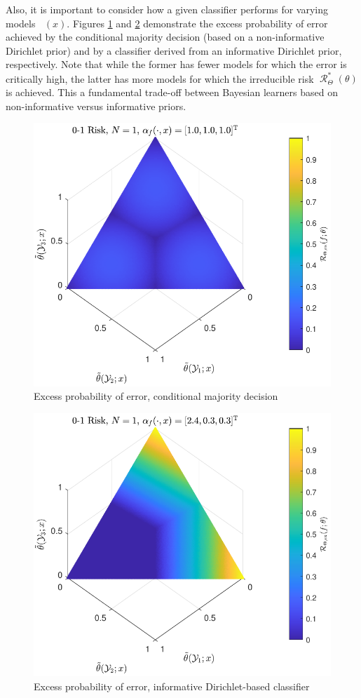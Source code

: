\documentclass[12pt]{report}
\DeclareMathOperator{\Rcal}{\mathcal{R}}
\DeclareMathOperator{\thetac}{\theta_\text{c}}
\begin{document}
Also, it is important to consider how a given classifier performs for varying models $\thetac(x)$. Figures \ref{fig:Risk_cond_ex_01_Dir_theta__uni} and \ref{fig:Risk_cond_ex_01_Dir_theta__subj} demonstrate the excess probability of error achieved by the conditional majority decision (based on a non-informative Dirichlet prior) and by a classifier derived from an informative Dirichlet prior, respectively. Note that while the former has fewer models for which the error is critically high, the latter has more models for which the irreducible risk $\Rcal_{\Theta}^*(\theta)$ is achieved. This a fundamental trade-off between Bayesian learners based on non-informative versus informative priors.
\begin{figure}
\centering
\includegraphics[width=0.7\linewidth]{Risk_cond_ex_01_Dir_theta__uni.pdf}
\caption{Excess probability of error, conditional majority decision}
\label{fig:Risk_cond_ex_01_Dir_theta__uni}
\end{figure}
%
\begin{figure}
\centering
\includegraphics[width=0.7\linewidth]{Risk_cond_ex_01_Dir_theta__subj.pdf}
\caption{Excess probability of error, informative Dirichlet-based classifier}
\label{fig:Risk_cond_ex_01_Dir_theta__subj}
\end{figure}
\end{document}
